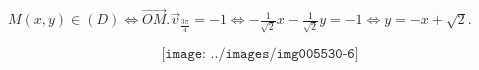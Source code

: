 {\begin{enumerate}
{\begin{center}
$M(x,y)\in(D)\Leftrightarrow\overrightarrow{OM}.\overrightarrow{v}_{\frac{3\pi}{4}}=-1\Leftrightarrow-\frac{1}{\sqrt{2}}x-\frac{1}{\sqrt{2}}y=-1\Leftrightarrow y=-x+\sqrt{2}$.
\end{center}

$$\texttt{[image: ../images/img005530-6]}$$}
\end{enumerate}
}
